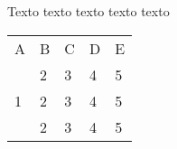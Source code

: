 \begin{quadro}
\caption{Texto texto texto texto texto}
\label{quad:exemplo_de_quadro}
\centering
\begin{tabular}{|lllll|}
\cline{1-5}
A& B &  C& D &E  \\ \cline{1-5}
\multirow{3}{*}{1}  & 2 &  3& 4& 5 \\
 &  2 &  3& 4& 5  \\
 &  2 &  3& 4& 5 \\
 \cline{1-5}
\end{tabular}
\end{quadro}
